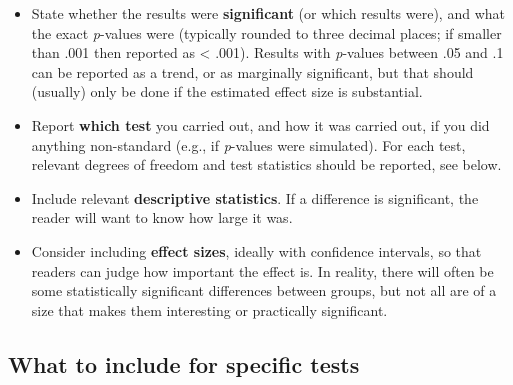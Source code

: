 \documentclass[
]{book}
\providecommand{\tightlist}{%
  \setlength{\itemsep}{0pt}\setlength{\parskip}{0pt}}
\begin{document}
\begin{itemize}
\tightlist
\item
  State whether the results were \textbf{significant} (or which results were), and what the exact \emph{p}-values were (typically rounded to three decimal places; if smaller than .001 then reported as \textless{} .001). Results with \emph{p}-values between .05 and .1 can be reported as a trend, or as marginally significant, but that should (usually) only be done if the estimated effect size is substantial.
\item
  Report \textbf{which test} you carried out, and how it was carried out, if you did anything non-standard (e.g., if \emph{p}-values were simulated). For each test, relevant degrees of freedom and test statistics should be reported, see below.
\item
  Include relevant \textbf{descriptive statistics}. If a difference is significant, the reader will want to know how large it was.
\item
  Consider including \textbf{effect sizes}, ideally with confidence intervals, so that readers can judge how important the effect is. In reality, there will often be some statistically significant differences between groups, but not all are of a size that makes them interesting or practically significant.
\end{itemize}

\hypertarget{what-to-include-for-specific-tests}{%
\subsection{What to include for specific tests}\label{what-to-include-for-specific-tests}}
\end{document}
